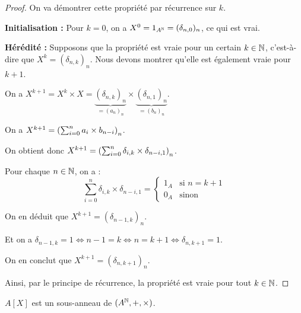 \documentclass[12pt,a4paper]{report}
\begin{document}
\begin{proof}
    On va démontrer cette propriété par récurrence sur $k$.

    \textbf{Initialisation :} Pour $k=0$, on a $X^0 = 1_{A^{\mathbb{N}}} = (\delta_{n,0})_n$, ce qui est vrai.

    \textbf{Hérédité :} Supposons que la propriété est vraie pour un certain $k \in \mathbb{N}$, c'est-à-dire que $X^k = (\delta_{n,k})_n$. Nous devons montrer qu'elle est également vraie pour $k+1$.

    On a $X^{k+1} = X^k \times X = \underbrace{(\delta_{n,k})_n}_{=(a_n)_n} \times \underbrace{(\delta_{n,1})_n}_{=(b_n)_n}$.

    On a $X^{k+1} = \left(\sum_{i=0}^{n}a_i\times b_{n-i}\right)_n$.

    On obtient donc $X^{k+1} = \left(\sum_{i=0}^{n}\delta_{i,k}\times \delta_{n-i,1}\right)_n$.

    Pour chaque $n \in \mathbb{N}$, on a :
    \[\sum_{i=0}^{n}\delta_{i,k}\times \delta_{n-i,1} = \begin{cases}
    1_A & \text{si } n = k+1\\
    0_A & \text{sinon}
    \end{cases}\]

    On en déduit que $X^{k+1} = (\delta_{n-1,k})_n$.

    Et on a $\delta_{n-1,k} = 1 \iff n-1 = k \iff n = k+1 \iff \delta_{n,k+1} = 1$.

    On en conclut que $X^{k+1} = (\delta_{n,k+1})_n$.

    Ainsi, par le principe de récurrence, la propriété est vraie pour tout $k \in \mathbb{N}$.
\end{proof}

\begin{property}
    $A[X]$ est un sous-anneau de $(A^{\mathbb{N}}, +, \times)$.
\end{property}
\end{document}
